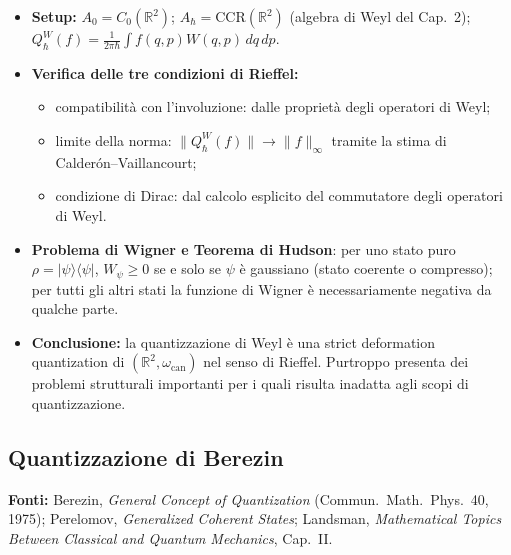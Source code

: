 \documentclass[12pt, a4paper]{article}
\newcommand{\fonti}[1]{%
	\begin{fontebox}
		\textcolor{fontecolor}{\footnotesize\textbf{Fonti:} #1}
	\end{fontebox}%
}
\begin{document}
	\begin{itemize}
		\item \textbf{Setup:} $A_0 = C_0(\mathbb{R}^2)$; $A_\hbar = \mathrm{CCR}(\mathbb{R}^2)$
		(algebra di Weyl del Cap.\ 2); $Q_\hbar^W(f) = \frac{1}{2\pi\hbar}\int f(q,p) W(q,p)\, dq\, dp$.
		\item \textbf{Verifica delle tre condizioni di Rieffel:}
		\begin{itemize}
			\item[(i)] compatibilità con l'involuzione: dalle proprietà degli operatori di Weyl;
			\item[(ii)] limite della norma: $\|Q_\hbar^W(f)\| \to \|f\|_\infty$ tramite
			la stima di Calderón--Vaillancourt;
			\item[(iii)] condizione di Dirac: dal calcolo esplicito del commutatore degli
			operatori di Weyl.
		\end{itemize}
		\item \textbf{Problema di Wigner e Teorema di Hudson}: per uno stato puro $\rho=|\psi\rangle\langle\psi|$, $W_\psi \geq 0$ se e solo se $\psi$ è gaussiano (stato coerente o compresso); per tutti gli altri stati la funzione di Wigner è necessariamente negativa da qualche parte.
		\item \textbf{Conclusione:} la quantizzazione di Weyl è una strict deformation
		quantization di $(\mathbb{R}^2, \omega_{\mathrm{can}})$ nel senso di Rieffel. Purtroppo presenta dei problemi strutturali importanti per i quali risulta inadatta agli scopi di quantizzazione.
	\end{itemize}
	
	\subsection{Quantizzazione di Berezin}
	
	\fonti{Berezin, \textit{General Concept of Quantization} (Commun.\ Math.\ Phys.\ 40,
		1975); Perelomov, \textit{Generalized Coherent States}; Landsman, \textit{Mathematical
			Topics Between Classical and Quantum Mechanics}, Cap.~II.}
	
\end{document}
